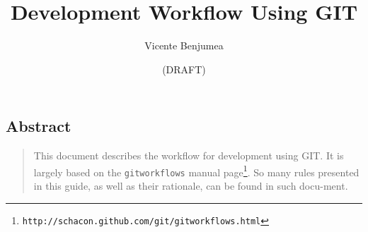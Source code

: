 \documentclass[a4paper]{article}
\title{Development Workflow Using GIT}
\author{Vicente Benjumea}
\date{(DRAFT)}
\begin{document}
\maketitle
\subsection*{Abstract}
\begin{quote}\small
This document describes the workflow for development using
GIT. It is largely based on the \verb|gitworkflows| manual
page\footnote{\texttt{http://schacon.github.com/git/gitworkflows.html}}. So
many rules presented in this guide, as well as their rationale, can be
found in such docu-ment.
\end{quote}
\end{document}
